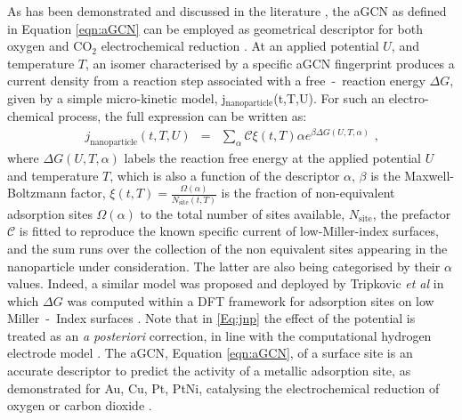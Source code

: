 As has been demonstrated and discussed in the literature \cite{https://doi.org/10.1002/cphc.201900564,C9NA00252A}, the aGCN as defined in Equation \ref{eqn:aGCN} can be employed as geometrical descriptor for both oxygen and CO$_{2}$ electrochemical reduction \cite{C6SC04788B,doi:10.1021/acscatal.7b01194}. At an applied potential $U$, and temperature
$T$, an isomer characterised by a specific aGCN fingerprint 
produces a current density from a reaction step associated with
a free~-~reaction energy $\Delta G$, given by a simple micro-kinetic model, j$_{\mathrm{nanoparticle}}$(t,T,U). For such an electro-chemical process, the full expression can be written as:
\begin{eqnarray}
j_{\mathrm{nanoparticle}}(t,T,U) &=&\sum_{\alpha} \mathcal{C} \xi(t,T)\alpha
e^{\beta \Delta G (U, T, \alpha)} \mbox{~,}
\label{Eq:jnp}
\end{eqnarray}
where $\Delta G (U, T, \alpha)$ labels the reaction free energy at the applied potential $U$ and temperature $T$, which is also a function of the descriptor $\alpha$, $\beta$ is the Maxwell-Boltzmann factor, $\xi(t,T) = \frac{\Omega(\alpha)}{N_{\mathrm{site}}(t,T)}$ is the fraction of non-equivalent adsorption sites $\Omega(\alpha)$ to the total number of sites available, $N_{\mathrm{site}}$, the prefactor $\mathcal{C}$ is fitted to reproduce the known specific current of low-Miller-index surfaces, and the sum runs over the collection of the non equivalent sites appearing in the nanoparticle under consideration. The latter are also being categorised by their $\alpha$ values. Indeed, a similar model was proposed and deployed by Tripkovic \textit{et al} in which $\Delta G$ was computed within a DFT framework for adsorption sites on low Miller~-~Index surfaces \cite{Tripkovic2014-wl} .
%
Note that in \ref{Eq:jnp} the effect of the potential is treated as an \textit{a posteriori} correction, in line with the computational hydrogen electrode model \cite{Norskov1998}. 
%
The aGCN, Equation \ref{eqn:aGCN}, of a surface site is an accurate descriptor to predict the activity of a metallic adsorption site, as demonstrated for Au, Cu, Pt, PtNi, catalysing the electrochemical reduction of oxygen or carbon dioxide  \cite{Calle-Vallejo2014,Calle2015,Zhao2016}.
